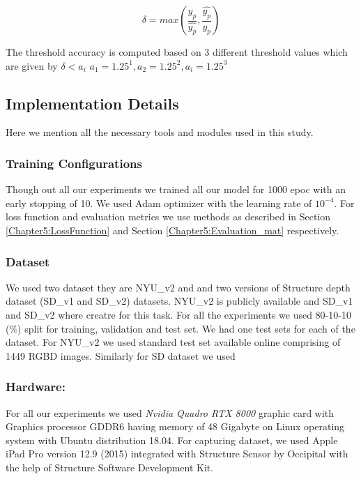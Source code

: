 \begin{equation} \label{ThresholdAcc}
    {\delta = max (\frac{{y_{p}}}{\hat{y_{p}}}, \frac{\hat{y_{p}}}{{y_{p}}})}
\end{equation}

The threshold accuracy is computed based on 3 different threshold values which are given by \(\delta < a_{i}\)  \(a_{1}= 1.25^1, a_{2} = 1.25^2, a_{i} = 1.25^3\)  






\subsection{Implementation Details}
\label{Chapter5:HardwarSoftwareDetails}
Here we mention all the necessary tools and modules used in this study. 

 \subsubsection{Training Configurations} 
 \label{Chapter4:TrainConfigurations_i}

 Though out all our  experiments we trained all our model for 1000 epoc with an early stopping of 10. We used Adam \cite{kingma2014adam} optimizer with the learning rate of \(10^{-4}\). For loss function and evaluation metrics we use methods as described in Section \ref{Chapter5:LossFunction} and Section \ref{Chapter5:Evaluation_mat} respectively.
 
 \subsubsection{Dataset} 
  \label{Chapter4:DatasetForsplits-i}

 We used two dataset they are NYU\_v2 and and two versions of Structure depth dataset (SD\_v1 and SD\_v2) datasets. NYU\_v2 is publicly available and SD\_v1 and SD\_v2 where creatre for this task. For all the experiments we used 80-10-10 (\%) split for training, validation and test set. We had one test sets for each of the dataset. For NYU\_v2 we used standard test set available online comprising of 1449 RGBD images. Similarly for SD dataset we used 
 
 
\subsubsection{Hardware:} 
\label{Chapter4:Hardware_i}
For all our experiments we used \textit{Nvidia Quadro RTX 8000} graphic card with Graphics processor GDDR6  having memory of 48 Gigabyte on Linux operating system with Ubuntu distribution 18.04. For capturing dataset, we used Apple iPad Pro version 12.9 (2015) integrated with Structure Sensor by Occipital with the help of Structure Software Development Kit.


